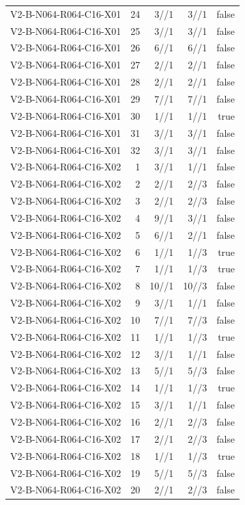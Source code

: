 {\begin{longtable}{lrrrr}
V2-B-N064-R064-C16-X01 & 24 & 3//1 & 3//1 & false \\
V2-B-N064-R064-C16-X01 & 25 & 3//1 & 3//1 & false \\
V2-B-N064-R064-C16-X01 & 26 & 6//1 & 6//1 & false \\
V2-B-N064-R064-C16-X01 & 27 & 2//1 & 2//1 & false \\
V2-B-N064-R064-C16-X01 & 28 & 2//1 & 2//1 & false \\
V2-B-N064-R064-C16-X01 & 29 & 7//1 & 7//1 & false \\
V2-B-N064-R064-C16-X01 & 30 & 1//1 & 1//1 & true \\
V2-B-N064-R064-C16-X01 & 31 & 3//1 & 3//1 & false \\
V2-B-N064-R064-C16-X01 & 32 & 3//1 & 3//1 & false \\
V2-B-N064-R064-C16-X02 & 1 & 3//1 & 1//1 & false \\
V2-B-N064-R064-C16-X02 & 2 & 2//1 & 2//3 & false \\
V2-B-N064-R064-C16-X02 & 3 & 2//1 & 2//3 & false \\
V2-B-N064-R064-C16-X02 & 4 & 9//1 & 3//1 & false \\
V2-B-N064-R064-C16-X02 & 5 & 6//1 & 2//1 & false \\
V2-B-N064-R064-C16-X02 & 6 & 1//1 & 1//3 & true \\
V2-B-N064-R064-C16-X02 & 7 & 1//1 & 1//3 & true \\
V2-B-N064-R064-C16-X02 & 8 & 10//1 & 10//3 & false \\
V2-B-N064-R064-C16-X02 & 9 & 3//1 & 1//1 & false \\
V2-B-N064-R064-C16-X02 & 10 & 7//1 & 7//3 & false \\
V2-B-N064-R064-C16-X02 & 11 & 1//1 & 1//3 & true \\
V2-B-N064-R064-C16-X02 & 12 & 3//1 & 1//1 & false \\
V2-B-N064-R064-C16-X02 & 13 & 5//1 & 5//3 & false \\
V2-B-N064-R064-C16-X02 & 14 & 1//1 & 1//3 & true \\
V2-B-N064-R064-C16-X02 & 15 & 3//1 & 1//1 & false \\
V2-B-N064-R064-C16-X02 & 16 & 2//1 & 2//3 & false \\
V2-B-N064-R064-C16-X02 & 17 & 2//1 & 2//3 & false \\
V2-B-N064-R064-C16-X02 & 18 & 1//1 & 1//3 & true \\
V2-B-N064-R064-C16-X02 & 19 & 5//1 & 5//3 & false \\
V2-B-N064-R064-C16-X02 & 20 & 2//1 & 2//3 & false \\

\end{longtable}}
